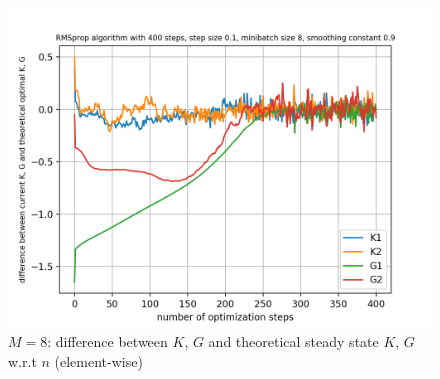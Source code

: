 \documentclass{article}
\begin{document}
\begin{figure}[h!]
\begin{minipage}[t]{.28\paperwidth}
		\includegraphics[width=1.0\textwidth]{Figures/d_M8_sep.png}
		\caption{$M=8$: difference between $K$, $G$ and theoretical steady state $K$, $G$ w.r.t $n$ (element-wise)}
	\end{minipage}
\end{figure}
\end{document}
